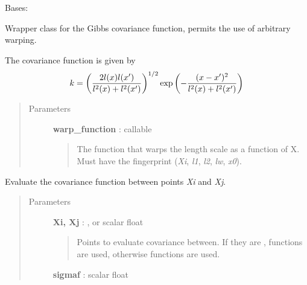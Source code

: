 \documentclass[letterpaper,10pt,english]{sphinxmanual}
\begin{document}

\begin{fulllineitems}
\label{gptools.kernel:gptools.kernel.gibbs.GibbsFunction1d}
Bases: 

Wrapper class for the Gibbs covariance function, permits the use of arbitrary warping.

The covariance function is given by
\begin{gather}
\begin{split}k = \left ( \frac{2l(x)l(x')}{l^2(x)+l^2(x')} \right )^{1/2}\exp\left ( -\frac{(x-x')^2}{l^2(x)+l^2(x')} \right )\end{split}\notag
\end{gather}\begin{quote}\begin{description}
\item[{Parameters }] \leavevmode
\textbf{warp\_function} : callable
\begin{quote}

The function that warps the length scale as a function of X. Must have
the fingerprint (\emph{Xi}, \emph{l1}, \emph{l2}, \emph{lw}, \emph{x0}).
\end{quote}

\end{description}\end{quote}

\begin{fulllineitems}
\label{gptools.kernel:gptools.kernel.gibbs.GibbsFunction1d.__call__}
Evaluate the covariance function between points \emph{Xi} and \emph{Xj}.
\begin{quote}\begin{description}
\item[{Parameters }] \leavevmode
\textbf{Xi, Xj} : ,  or scalar float
\begin{quote}

Points to evaluate covariance between. If they are ,
 functions are used, otherwise 
functions are used.
\end{quote}

\textbf{sigmaf} : scalar float
\begin{quote}


\end{quote}
\end{description}
\end{quote}
\end{fulllineitems}
\end{fulllineitems}
\end{document}
